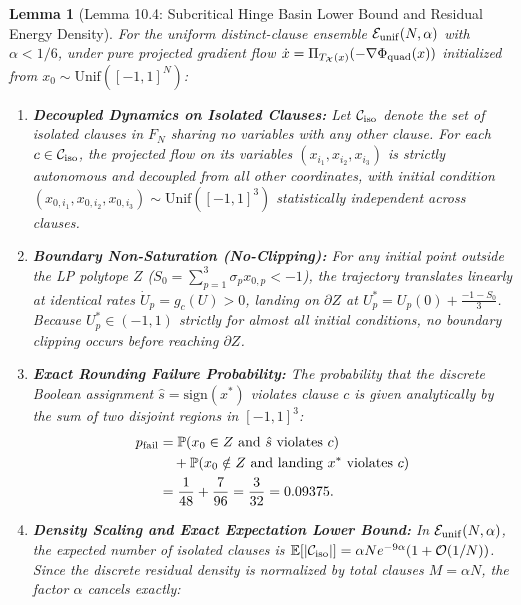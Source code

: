 \documentclass[11pt,a4paper]{article}
\newtheorem{lemma}[theorem]{Lemma}
\begin{document}
\begin{lemma}[Lemma 10.4: Subcritical Hinge Basin Lower Bound and Residual Energy Density]
\label{lem:hinge_lower_bound}
For the uniform distinct-clause ensemble $\mathcal E_{\rm unif}(N,\alpha)$ with $\alpha<1/6$, under pure projected gradient flow $\dot{x} = \Pi_{T_{\mathcal{X}}(x)}(-\nabla \Phi_{\rm quad}(x))$ initialized from $x_0 \sim \text{Unif}([-1, 1]^N)$:
\begin{enumerate}
    \item \textbf{Decoupled Dynamics on Isolated Clauses:} Let $\mathcal{C}_{\rm iso}$ denote the set of isolated clauses in $F_N$ sharing no variables with any other clause. For each $c \in \mathcal{C}_{\rm iso}$, the projected flow on its variables $(x_{i_1}, x_{i_2}, x_{i_3})$ is strictly autonomous and decoupled from all other coordinates, with initial condition $(x_{0, i_1}, x_{0, i_2}, x_{0, i_3}) \sim \text{Unif}([-1, 1]^3)$ statistically independent across clauses.
    \item \textbf{Boundary Non-Saturation (No-Clipping):} For any initial point outside the LP polytope $Z$ ($S_0 = \sum_{p=1}^3 \sigma_p x_{0, p} < -1$), the trajectory translates linearly at identical rates $\dot{U}_p = g_c(U) > 0$, landing on $\partial Z$ at $U_p^* = U_p(0) + \frac{-1 - S_0}{3}$. Because $U_p^* \in (-1, 1)$ strictly for almost all initial conditions, no boundary clipping occurs before reaching $\partial Z$.
    \item \textbf{Exact Rounding Failure Probability:} The probability that the discrete Boolean assignment $\hat{s} = \text{sign}(x^*)$ violates clause $c$ is given analytically by the sum of two disjoint regions in $[-1, 1]^3$:
    \begin{equation}
    \begin{aligned}
    p_{\rm fail}
    &={}\mathbb P(x_0\in Z\text{ and }\hat s\text{ violates }c)\\
    &\quad+\mathbb P(x_0\notin Z\text{ and landing }x^*\text{ violates }c)\\
    &=\frac1{48}+\frac7{96}=\frac3{32}=0.09375.
    \end{aligned}
    \end{equation}
    \item \textbf{Density Scaling and Exact Expectation Lower Bound:} In $\mathcal E_{\rm unif}(N,\alpha)$, the expected number of isolated clauses is $\mathbb{E}[|\mathcal{C}_{\rm iso}|] = \alpha N e^{-9\alpha}(1 + \mathcal{O}(1/N))$. Since the discrete residual density is normalized by total clauses $M = \alpha N$, the factor $\alpha$ cancels exactly:

\end{enumerate}
\end{lemma}
\end{document}
